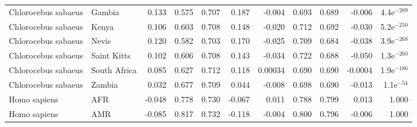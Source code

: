 \begin{longtable}{llrrrrrrrrr}
 Chlorocebus sabaeus &                    Gambia &                              0.133 &                               0.575 &                 0.707 &                 0.187 &                             -0.004 &                               0.693 &                 0.689 &                -0.006 & 4.4e$^{-289}$ \\
 Chlorocebus sabaeus &                     Kenya &                              0.106 &                               0.603 &                 0.708 &                 0.148 &                             -0.020 &                               0.712 &                 0.692 &                -0.030 & 5.2e$^{-250}$ \\
 Chlorocebus sabaeus &                     Nevis &                              0.120 &                               0.582 &                 0.703 &                 0.170 &                             -0.025 &                               0.709 &                 0.684 &                -0.038 & 3.9e$^{-268}$ \\
 Chlorocebus sabaeus &               Saint Kitts &                              0.102 &                               0.606 &                 0.708 &                 0.143 &                             -0.034 &                               0.722 &                 0.688 &                -0.050 & 1.3e$^{-260}$ \\
 Chlorocebus sabaeus &              South Africa &                              0.085 &                               0.627 &                 0.712 &                 0.118 &                            0.00034 &                               0.690 &                 0.690 &               -0.0004 & 1.9e$^{-186}$ \\
 Chlorocebus sabaeus &                    Zambia &                              0.032 &                               0.677 &                 0.709 &                 0.044 &                             -0.008 &                               0.698 &                 0.690 &                -0.013 &  1.1e$^{-54}$ \\
        Homo sapiens &                       AFR &                             -0.048 &                               0.778 &                 0.730 &                -0.067 &                              0.011 &                               0.788 &                 0.799 &                 0.013 &         1.000 \\
        Homo sapiens &                       AMR &                             -0.085 &                               0.817 &                 0.732 &                -0.118 &                             -0.004 &                               0.800 &                 0.796 &                -0.006 &         1.000 \\

\end{longtable}
